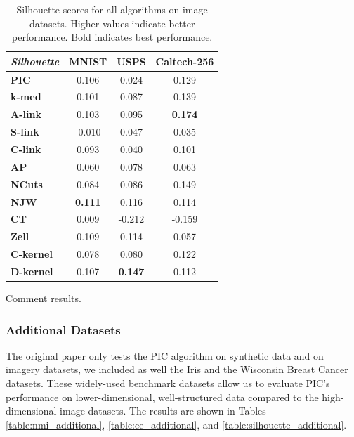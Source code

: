 \begin{table}[h]
    \centering
    \begin{tabular}{|l|c|c|c|}
    \hline
    \textit{Silhouette} & \textbf{MNIST} & \textbf{USPS} & \textbf{Caltech-256} \\
    \hline
    \textbf{PIC}       & 0.106 & 0.024 & 0.129 \\ \hline
    \textbf{k-med}     & 0.101 & 0.087 & 0.139 \\ \hline
    \textbf{A-link}    & 0.103 & 0.095 & \textbf{0.174} \\ \hline
    \textbf{S-link}    & -0.010 & 0.047 & 0.035 \\ \hline
    \textbf{C-link}    & 0.093 & 0.040 & 0.101 \\ \hline
    \textbf{AP}        & 0.060 & 0.078 & 0.063 \\ \hline
    \textbf{NCuts}     & 0.084 & 0.086 & 0.149 \\ \hline
    \textbf{NJW}       & \textbf{0.111} & 0.116 & 0.114 \\ \hline
    \textbf{CT}        & 0.009 & -0.212 & -0.159 \\ \hline
    \textbf{Zell}      & 0.109 & 0.114 & 0.057 \\ \hline
    \textbf{C-kernel}  & 0.078 & 0.080 & 0.122 \\ \hline
    \textbf{D-kernel}  & 0.107 & \textbf{0.147} & 0.112 \\
    \hline
    \end{tabular}
    \caption{Silhouette scores for all algorithms on image datasets. Higher values indicate better performance. Bold indicates best performance.}
    \label{table:silhouette}
\end{table}

Comment results.

\subsubsection{Additional Datasets}
The original paper only tests the PIC algorithm on synthetic data and on imagery datasets, we included as well the Iris and the Wisconsin Breast Cancer datasets. These widely-used benchmark datasets allow us to evaluate PIC's performance on lower-dimensional, well-structured data compared to the high-dimensional image datasets. The results are shown in Tables \ref{table:nmi_additional}, \ref{table:ce_additional}, and \ref{table:silhouette_additional}.

